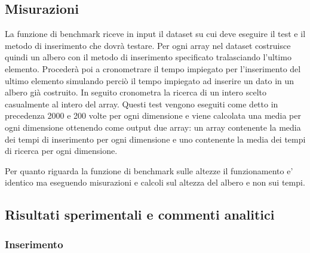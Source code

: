 \subsection{Misurazioni}
\label{sec:Misurazioni_1}
La funzione di benchmark riceve in input il dataset su cui deve eseguire il test e il metodo di inserimento che dovrà testare. Per ogni array nel dataset costruisce quindi un albero con il metodo di
inserimento specificato tralasciando l'ultimo elemento.
Procederà poi a cronometrare il tempo impiegato per l'inserimento del ultimo elemento simulando perciò il tempo impiegato ad inserire un dato in un albero già costruito.
In seguito cronometra la ricerca di un intero scelto casualmente al intero del array.
Questi test vengono eseguiti come detto in precedenza 2000 e 200 volte per ogni dimensione e viene calcolata una media per ogni dimensione ottenendo come output due array: un array contenente la media
dei tempi di inserimento per ogni dimensione e uno contenente la media dei tempi di ricerca per ogni dimensione. 

Per quanto riguarda la funzione di benchmark sulle altezze il funzionamento e' identico ma eseguendo misurazioni e calcoli sul altezza del albero e non sui tempi.

\subsection{Risultati sperimentali e commenti analitici}
\label{sec:RisultatiSperimentaliCommentiAnalitici_1}

\subsubsection{Inserimento}


